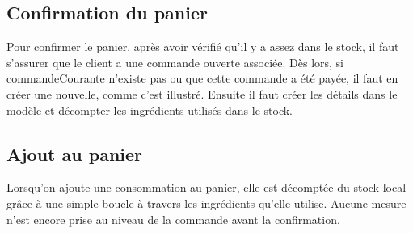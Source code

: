 \documentclass[a4paper,10pt]{article}
\begin{document}
\subsection{Confirmation du panier}
Pour confirmer le panier, après avoir vérifié qu'il y a assez dans le stock, il faut s'assurer que le client a une commande ouverte associée. Dès lors, si commandeCourante n'existe pas ou que cette commande a été payée, il faut en créer une nouvelle, comme c'est illustré. Ensuite il faut créer les détails dans le modèle et décompter les ingrédients utilisés dans le stock.

\subsection{Ajout au panier}
Lorsqu'on ajoute une consommation au panier, elle est décomptée du stock local grâce à une simple boucle à travers les ingrédients qu'elle utilise. Aucune mesure n'est encore prise au niveau de la commande avant la confirmation.
\end{document}
